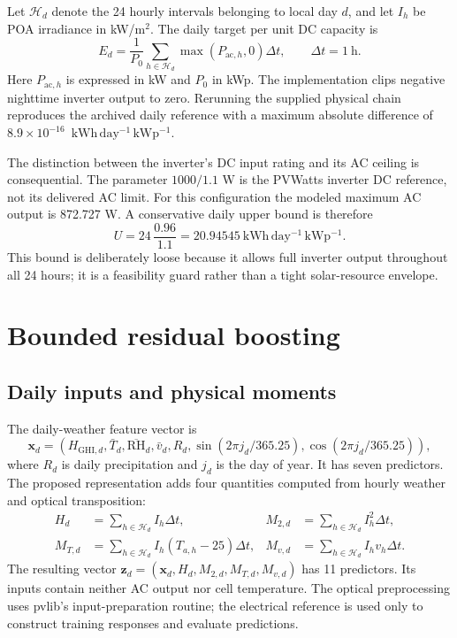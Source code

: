 \documentclass[11pt,a4paper]{article}
\newcommand{\unit}{\ensuremath{\mathrm{kWh\,day^{-1}\,kWp^{-1}}}}
\begin{document}
Let $\mathcal H_d$ denote the 24 hourly intervals belonging to local day $d$, and let $I_h$ be POA irradiance in kW/m$^2$. The daily target per unit DC capacity is
\begin{equation}
 E_d=\frac{1}{P_0}\sum_{h\in\mathcal H_d}\max(P_{\mathrm{ac},h},0)\Delta t,
 \qquad \Delta t=1\ \mathrm{h}.
 \label{eq:energy}
\end{equation}
Here $P_{\mathrm{ac},h}$ is expressed in kW and $P_0$ in kWp. The implementation clips negative nighttime inverter output to zero. Rerunning the supplied physical chain reproduces the archived daily reference with a maximum absolute difference of $8.9\times10^{-16}$~\unit{}.

The distinction between the inverter's DC input rating and its AC ceiling is consequential. The parameter $1000/1.1$ W is the PVWatts inverter DC reference, not its delivered AC limit. For this configuration the modeled maximum AC output is 872.727 W. A conservative daily upper bound is therefore
\begin{equation}
 U=24\,\frac{0.96}{1.1}=20.94545\ \unit{}.
 \label{eq:bound}
\end{equation}
This bound is deliberately loose because it allows full inverter output throughout all 24 hours; it is a feasibility guard rather than a tight solar-resource envelope.

\section{Bounded residual boosting}
\subsection{Daily inputs and physical moments}
The daily-weather feature vector is
\begin{equation}
 \bm x_d=(H_{\mathrm{GHI},d},\bar T_d,\overline{\mathrm{RH}}_d,\bar v_d,R_d,
 \sin(2\pi j_d/365.25),\cos(2\pi j_d/365.25)),
 \label{eq:daily}
\end{equation}
where $R_d$ is daily precipitation and $j_d$ is the day of year. It has seven predictors. The proposed representation adds four quantities computed from hourly weather and optical transposition:
\begin{align}
 H_d&=\sum_{h\in\mathcal H_d} I_h\Delta t, &
 M_{2,d}&=\sum_{h\in\mathcal H_d} I_h^2\Delta t,\nonumber\\
 M_{T,d}&=\sum_{h\in\mathcal H_d} I_h(T_{a,h}-25)\Delta t, &
 M_{v,d}&=\sum_{h\in\mathcal H_d} I_hv_h\Delta t.
 \label{eq:moments}
\end{align}
The resulting vector $\bm z_d=(\bm x_d,H_d,M_{2,d},M_{T,d},M_{v,d})$ has 11 predictors. Its inputs contain neither AC output nor cell temperature. The optical preprocessing uses pvlib's input-preparation routine; the electrical reference is used only to construct training responses and evaluate predictions.
\end{document}
